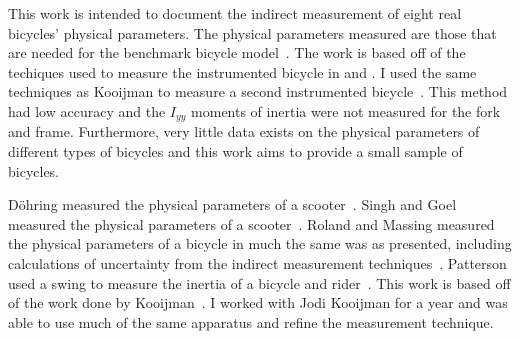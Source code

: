 \documentclass{bmd2010p}
\begin{document}
This work is intended to document the indirect measurement of eight real
bicycles' physical parameters. The physical parameters measured are those that
are needed for the benchmark bicycle model~\cite{Meijaard2007}. The work is
based off of the techiques used to measure the instrumented bicycle in
\cite{Kooijman2006} and \cite{Kooijman2008}. I used the same techniques as
Kooijman to measure a second instrumented bicycle~\cite{Moore2009a}. This
method had low accuracy and the $I_{yy}$ moments of inertia were
not measured for the fork and frame. Furthermore, very little data exists on
the physical parameters of different types of bicycles and this work aims to
provide a small sample of bicycles.

D\"{o}hring measured the physical parameters of a scooter~\cite{Dohring1953}.
Singh and Goel measured the physical parameters of a scooter~\cite{Singh1971}.
Roland and Massing measured the physical parameters of a bicycle in much the
same was as presented, including calculations of uncertainty from the indirect
measurement techniques~\cite{Roland1971}. Patterson used a swing to measure the
inertia of a bicycle and rider~\cite{Patterson2004}. This work is based off of the work
done by Kooijman~\cite{Kooijman2006}. I worked with Jodi Kooijman for a year and
was able to use much of the same apparatus and refine the measurement
technique.
\end{document}

